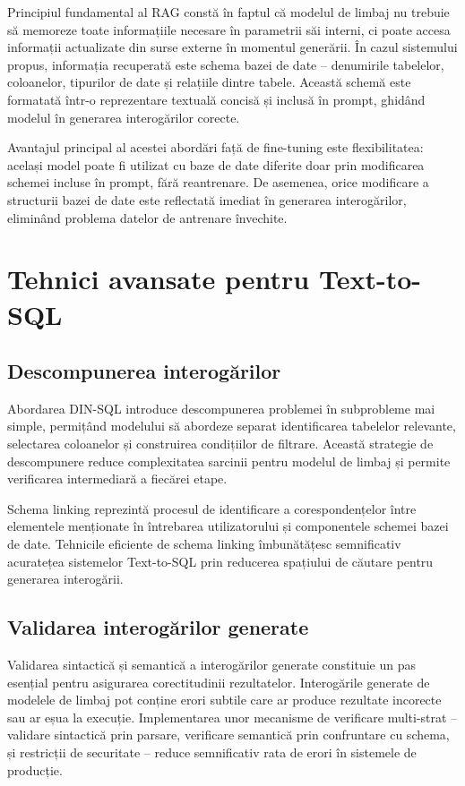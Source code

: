 \documentclass[12pt, a4paper]{report}
\begin{document}
Principiul fundamental al RAG constă în faptul că modelul de limbaj nu trebuie să memoreze toate informațiile necesare în parametrii săi interni, ci poate accesa informații actualizate din surse externe în momentul generării. În cazul sistemului propus, informația recuperată este schema bazei de date -- denumirile tabelelor, coloanelor, tipurilor de date și relațiile dintre tabele. Această schemă este formatată într-o reprezentare textuală concisă și inclusă în prompt, ghidând modelul în generarea interogărilor corecte.

Avantajul principal al acestei abordări față de fine-tuning este flexibilitatea: același model poate fi utilizat cu baze de date diferite doar prin modificarea schemei incluse în prompt, fără reantrenare. De asemenea, orice modificare a structurii bazei de date este reflectată imediat în generarea interogărilor, eliminând problema datelor de antrenare învechite.

\section{Tehnici avansate pentru Text-to-SQL}

\subsection{Descompunerea interogărilor}

Abordarea DIN-SQL \cite{dinsql} introduce descompunerea problemei în subprobleme mai simple, permițând modelului să abordeze separat identificarea tabelelor relevante, selectarea coloanelor și construirea condițiilor de filtrare. Această strategie de descompunere reduce complexitatea sarcinii pentru modelul de limbaj și permite verificarea intermediară a fiecărei etape.

Schema linking reprezintă procesul de identificare a corespondențelor între elementele menționate în întrebarea utilizatorului și componentele schemei bazei de date. Tehnicile eficiente de schema linking îmbunătățesc semnificativ acuratețea sistemelor Text-to-SQL prin reducerea spațiului de căutare pentru generarea interogării.

\subsection{Validarea interogărilor generate}

Validarea sintactică și semantică a interogărilor generate constituie un pas esențial pentru asigurarea corectitudinii rezultatelor. Interogările generate de modelele de limbaj pot conține erori subtile care ar produce rezultate incorecte sau ar eșua la execuție. Implementarea unor mecanisme de verificare multi-strat -- validare sintactică prin parsare, verificare semantică prin confruntare cu schema, și restricții de securitate -- reduce semnificativ rata de erori în sistemele de producție.
\end{document}
